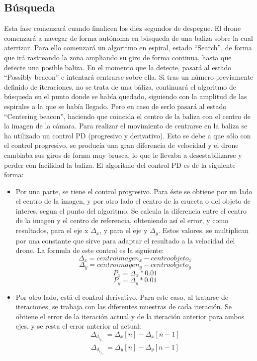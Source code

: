 \subsection{B\'usqueda}
\hspace{1 cm} Esta fase comenzar\'a cuando finalicen los diez segundos de despegue. El drone comenzar\'a a navegar de forma aut\'onoma en b\'usqueda de una baliza sobre la cual aterrizar. Para ello comenzar\'a un algoritmo en espiral, estado "`Search"', de forma que ir\'a rastreando la zona ampliando su giro de forma continua, hasta que detecte una posible baliza. En el momento que la detecte, pasar\'a al estado "`Possibly beacon"' e intentar\'a centrarse sobre ella. Si tras un n\'umero previamente definido de iteraciones, no se trata de una b\'aliza, continuar\'a el algoritmo de b\'usqueda en el punto donde se hab\'ia quedado, siguiendo con la amplitud de las espirales a la que se hab\'ia llegado. Pero en caso de serlo pasar\'a al estado "`Centering beacon"', haciendo que coincida el centro de la baliza con el centro de la imagen de la c\'amara. Para realizar el movimiento de centrarse en la baliza se ha utilizado un control PD (progresivo y derivativo). Esto se debe a que s\'olo con el control progresivo, se produc\'ia una gran diferencia de velocidad y el drone cambiaba sus giros de forma muy brusca, lo que le llevaba a desestabilizarse y perder con facilidad la baliza. El algoritmo del control PD es de la siguiente forma:

\begin{itemize}
\item Por una parte, se tiene el control progresivo. Para \'este se obtiene por un lado el centro de la imagen, y por otro lado el centro de la cruceta o del objeto de interes, segun el punto del algoritmo. Se calcula la diferencia entre el centro de la imagen y el centro de referencia, obteniendo as\'i el error, y como resultados, para el eje x $\Delta_x$,  y para el eje y $\Delta_y$. Estos valores, se multiplican por una constante que sirve para adaptar el resultado a la velocidad del drone. La formula de este control es la siguiente:  \[\Delta_x = centroimagen_x - centroobjeto_x\]   \[\Delta_y = centroimagen_y - centroobjeto_y\]  \[ P_x = \Delta_x * 0.01\]  \[P_y = \Delta_y * 0.01\]




\item Por otro lado, est\'a el control derivativo. Para este caso, al tratarse de iteraciones, se trabaja con las diferentes muestras de cada iteración. Se obtiene el error de la iteraci\'on actual y de la iteraci\'on anterior para ambos ejes, y se resta el error anterior al actual: \[\Delta_d_i_f_e_r_e_n_c_i_a_x =  \Delta_x [n] - \Delta_x [n-1] \] \[\Delta_d_i_f_e_r_e_n_c_i_a_y =  \Delta_y [n] - \Delta_y [n-1] \]

\end{itemize}


